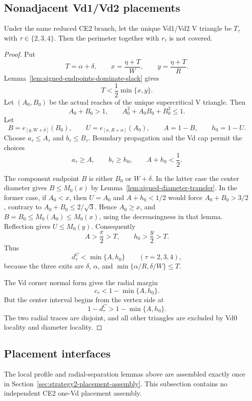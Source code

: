\subsection{Nonadjacent Vd1/Vd2 placements}

\begin{lemma}
\label{lem:signed-vd-nonadjacent-placement}
\label{thm:s2-geom-vd-nonadjacent}
Under the same reduced CE2 branch, let the unique Vd1/Vd2 V triangle be
$T_\tau$ with $\tau\in\{2,3,4\}$.  Then the perimeter together with
$r_\tau$ is not covered.
\end{lemma}

\begin{proof}
Put
\[
 T=\alpha+\delta,
 \qquad
 x=\frac{\eta+T}{W},
 \qquad
 y=\frac{\eta+T}{R}.
\]
Lemma~\ref{lem:signed-endpoints-dominate-slack} gives
\[
 T<\frac12\min\{x,y\}.
\]
Let $(A_0,B_0)$ be the actual reaches of the unique supercritical V triangle.
Then
\[
 A_0+B_0>1,\qquad A_0^2+A_0B_0+B_0^2\le1.
\]
Let
\[
 B=e_{[y,W+\delta]}(B_0),
 \qquad U=e_{[x,R+\alpha]}(A_0),
 \qquad A=1-B,
 \qquad h_0=1-U.
\]
Choose $a_\tau\le A_\tau$ and $b_\tau\le B_\tau$.  Boundary propagation
and the Vd cap permit the choices
\[
 a_\tau\ge A,
 \qquad b_\tau\ge h_0,
 \qquad A+h_0<\frac12.
\]

The component endpoint $B$ is either
$B_0$ or $W+\delta$.  In the latter case the center diameter gives
$B\le M_0(x)$ by Lemma~\ref{lem:signed-diameter-transfer}.  In the former
case, if $A_0<x$, then $U=A_0$ and
$A+h_0<1/2$ would force $A_0+B_0>3/2$, contrary to
$A_0+B_0\le2/\sqrt3$.  Hence $A_0\ge x$, and
$B=B_0\le M_0(A_0)\le M_0(x)$, using the decreasingness in that lemma.
Reflection gives $U\le M_0(y)$.
Consequently
\[
 A>\frac x2>T,
 \qquad
 h_0>\frac y2>T.
\]
Thus
\[
 d_\tau^C<\min\{A,h_0\}
 \qquad(\tau=2,3,4),
\]
because the three exits are $\delta$, $\alpha$, and
$\min\{\alpha/R,\delta/W\}\le T$.

The Vd corner normal form gives the radial margin
\[
 c_\tau<1-\min\{A,h_0\}.
\]
But the center interval begins from the vertex side at
\[
 1-d_\tau^C>1-\min\{A,h_0\}.
\]
The two radial traces are disjoint, and all other triangles are excluded by Vd0
locality and diameter locality.
\end{proof}

\subsection{Placement interfaces}

The local profile and radial-separation lemmas above are assembled exactly
once in Section~\ref{sec:strategy2-placement-assembly}.  This subsection
contains no independent CE2 one-Vd placement assembly.
